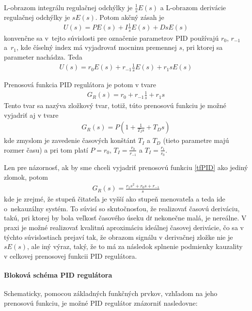 \documentclass[a4paper, 10pt, ]{article}
\begin{document}
L-obrazom integrálu regulačnej odchýlky je $\frac{1}{s} E(s)$ a L-obrazom derivácie regulačnej odchýlky je $sE(s)$. Potom akčný zásah je
\begin{align}
    U(s) = P E(s) + I  \frac{1}{s} E(s) + D  sE(s)
\end{align}
konvenčne sa v~tejto súvislosti pre označenie parametrov PID používajú $r_0$, $r_{-1}$ a~$r_1$, kde číselný index má vyjadrovať mocninu premennej $s$, pri ktorej sa parameter nachádza. Teda
\begin{align}
    U(s) = r_0 E(s) + r_{-1}  \frac{1}{s} E(s) + r_1  sE(s)
\end{align}

Prenosová funkcia PID regulátora je potom v tvare
\begin{align} \label{tfPID}
    G_R(s) = r_0  + r_{-1}  \frac{1}{s}  + r_1  s
\end{align}
Tento tvar sa nazýva zložkový tvar, totiž, túto prenosovú funkciu je možné vyjadriť aj v tvare
\begin{align}
    G_R(s) = P \left( 1 +  \frac{1}{T_I s}  +  T_D  s \right)
\end{align}
kde zmyslom je zavedenie časových konštánt $T_I$ a $T_D$ (tieto parametre majú rozmer času) a pri tom platí $P = r_0$, $T_I = \frac{r_0}{r_{-1}}$ a $T_I = \frac{r_1}{r_0}$.

Len pre názornosť, ak by sme chceli vyjadriť prenosovú funkciu \eqref{tfPID} ako jediný zlomok, potom
\begin{align} \label{tfPID2}
    G_R(s) =  \frac{ r_1 s^2 + r_0 s + r_{-1} }{s}
\end{align}
kde je zrejmé, že stupeň čitateľa je vyšší ako stupeň menovateľa a teda ide o~nekauzálny systém. To súvisí so skutočnosťou, že realizovať časovú deriváciu, takú, pri ktorej by bola veľkosť časového úseku $\text{d}t$ nekonečne malá, je nereálne. V praxi je možné realizovať kvalitnú aproximáciu ideálnej časovej derivácie, čo sa v týchto súvislostiach prejaví tak, že obrazom signálu v derivačnej zložke nie je $sE(s)$, ale iný výraz, taký, že to má za následok splnenie podmienky kauzality v celkovej prenosovej funkcii PID regulátora.






\paragraph{Bloková schéma PID regulátora}

Schematicky, pomocou základných funkčných prvkov, vzhľadom na jeho prenosovú funkciu, je možné PID regulátor znázorniť nasledovne:
\end{document}
